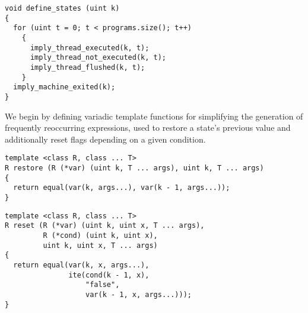 \begin{lstlisting}[style=c++]
void define_states (uint k)
{
  for (uint t = 0; t < programs.size(); t++)
    {
      imply_thread_executed(k, t);
      imply_thread_not_executed(k, t);
      imply_thread_flushed(k, t);
    }
  imply_machine_exited(k);
}
\end{lstlisting}

\noindent
We begin by defining variadic template functions for simplifying the generation of frequently reoccurring expressions, used to restore a state's previous value and additionally reset flags depending on a given condition.

\begin{lstlisting}[style=c++]
template <class R, class ... T>
R restore (R (*var) (uint k, T ... args), uint k, T ... args)
{
  return equal(var(k, args...), var(k - 1, args...));
}
\end{lstlisting}

\begin{lstlisting}[style=c++, aboveskip=0pt]
template <class R, class ... T>
R reset (R (*var) (uint k, uint x, T ... args),
         R (*cond) (uint k, uint x),
         uint k, uint x, T ... args)
{
  return equal(var(k, x, args...),
               ite(cond(k - 1, x),
                   "false",
                   var(k - 1, x, args...)));
}
\end{lstlisting}

